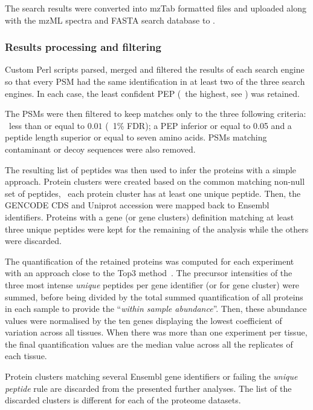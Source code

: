 The search results were converted into mzTab formatted files and uploaded along
with the mzML spectra and FASTA search database to .\mybr\

\subsubsection{Results processing and filtering}\label{subsub:resultsFiltering}

Custom Perl scripts parsed, merged and filtered the results of each search engine
so that every \gls{PSM} had the same identification in at least two of the three
search engines.
In each case, the least confident \gls{PEP} (\ie\ the highest, see ) was retained.\mybr\

The \glspl{PSM} were then filtered to keep matches only to the three following
criteria:
\qval\ less than or equal to $0.01$ (\ie\ 1\% \gls{FDR});
a \gls{PEP} inferior or equal to 0.05 and
a peptide length superior or equal to seven amino acids.
\glspl{PSM} matching contaminant or decoy sequences were also removed.\mybr\

The resulting list of peptides was then used to infer the proteins with
a simple approach.
Protein clusters were created based on the common matching non-null set of peptides,
\ie\ each protein cluster has at least one unique peptide.
Then, the \gls{GENCODE} \gls{CDS} and \gls{Uniprot} accession were mapped back to
\gls{Ensembl} identifiers.
Proteins with a gene (or gene clusters) definition
matching at least three unique peptides
were kept for the remaining of the analysis
while the others were discarded.\mybr\

The quantification of the retained proteins was computed for each experiment
with an approach close to the Top3 method~.
The precursor intensities of the three most intense \emph{unique} peptides
per gene identifier (or for gene cluster) were summed,
before being divided by the total summed quantification of all proteins
in each sample to provide the \enquote{\emph{within sample abundance}}.
Then, these abundance values were normalised by the ten genes displaying
the  lowest  coefficient  of  variation  across  all  tissues.
When there was more than one experiment per tissue,
the final quantification values are
the median value across all the replicates of each tissue.\mybr\

Protein clusters matching several \gls{Ensembl} gene identifiers or
failing the \emph{unique peptide} rule are discarded
from the presented further analyses.
The list of the discarded clusters is different for each of the
proteome datasets.\mybr\


